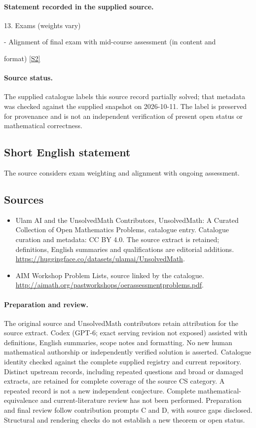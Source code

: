 \documentclass[11pt]{article}
\begin{document}
\paragraph{Statement recorded in the supplied source.}
13. Exams (weights vary)

- Alignment of final exam with mid-course assessment (in content and

format) \href{http://aimath.org/pastworkshops/oerassessmentproblems.pdf}{[S2]}
\paragraph{Source status.}
The supplied catalogue labels this source record partially solved; that metadata was checked against the supplied snapshot on 2026-10-11. The label is preserved for provenance and is not an independent verification of present open status or mathematical correctness.
\subsection{Short English statement}
The source considers exam weighting and alignment with ongoing assessment.
\subsection{Sources}
\begin{itemize}
\item[S1] Ulam AI and the UnsolvedMath Contributors, UnsolvedMath: A Curated Collection of Open Mathematics Problems, catalogue entry. Catalogue curation and metadata: CC BY 4.0. The source extract is retained; definitions, English summaries and qualifications are editorial additions.
\url{https://huggingface.co/datasets/ulamai/UnsolvedMath}.
\item[S2] AIM Workshop Problem Lists, source linked by the catalogue.
\url{http://aimath.org/pastworkshops/oerassessmentproblems.pdf}.
\end{itemize}
\paragraph{Preparation and review.}
The original source and UnsolvedMath contributors retain attribution for the source extract. Codex (GPT-6; exact serving revision not exposed) assisted with definitions, English summaries, scope notes and formatting. No new human mathematical authorship or independently verified solution is asserted. Catalogue identity checked against the complete supplied registry and current repository. Distinct upstream records, including repeated questions and broad or damaged extracts, are retained for complete coverage of the source CS category. A repeated record is not a new independent conjecture. Complete mathematical-equivalence and current-literature review has not been performed. Preparation and final review follow contribution prompts C and D, with source gaps disclosed. Structural and rendering checks do not establish a new theorem or open status.
\label{end:statement}
\end{document}
